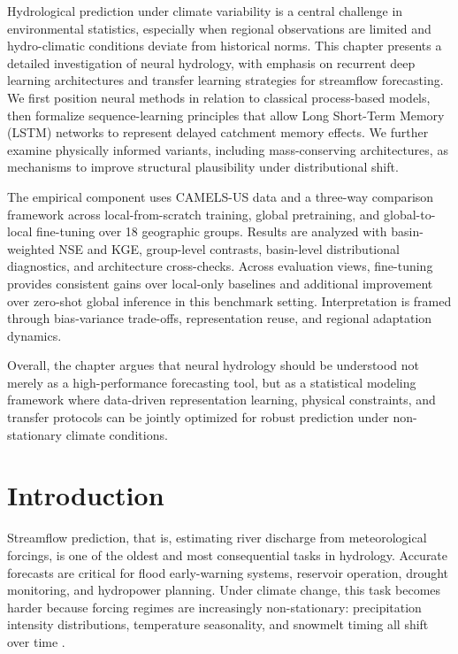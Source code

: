 \documentclass[
]{krantz}
\begin{document}
Hydrological prediction under climate variability is a central challenge in environmental
statistics, especially when regional observations are limited and hydro-climatic
conditions deviate from historical norms. This chapter presents a detailed investigation
of neural hydrology, with emphasis on recurrent deep learning architectures and transfer
learning strategies for streamflow forecasting. We first position neural methods in
relation to classical process-based models, then formalize sequence-learning principles
that allow Long Short-Term Memory (LSTM) networks to represent delayed catchment memory
effects. We further examine physically informed variants, including mass-conserving
architectures, as mechanisms to improve structural plausibility under distributional
shift.

The empirical component uses CAMELS-US data and a three-way comparison framework across
local-from-scratch training, global pretraining, and global-to-local fine-tuning over
18 geographic groups. Results are analyzed with basin-weighted NSE and KGE, group-level
contrasts, basin-level distributional diagnostics, and architecture cross-checks. Across
evaluation views, fine-tuning provides consistent gains over local-only baselines and
additional improvement over zero-shot global inference in this benchmark setting.
Interpretation is framed through bias-variance trade-offs, representation reuse, and
regional adaptation dynamics.

Overall, the chapter argues that neural hydrology should be understood not merely as a
high-performance forecasting tool, but as a statistical modeling framework where
data-driven representation learning, physical constraints, and transfer protocols can be
jointly optimized for robust prediction under non-stationary climate conditions.

\section{Introduction}\label{nh-introduction}

Streamflow prediction, that is, estimating river discharge from meteorological forcings,
is one of the oldest and most consequential tasks in hydrology. Accurate forecasts are
critical for flood early-warning systems, reservoir operation, drought monitoring, and
hydropower planning. Under climate change, this task becomes harder because forcing
regimes are increasingly non-stationary: precipitation intensity distributions,
temperature seasonality, and snowmelt timing all shift over time \citep{ipcc2021carbon}.
\end{document}
